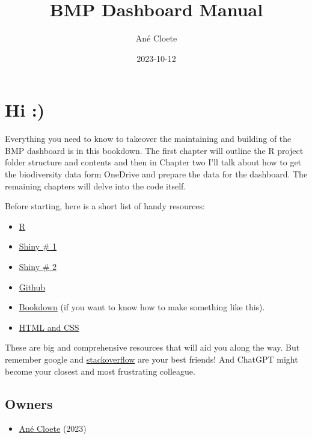 \documentclass[
]{book}
\title{BMP Dashboard Manual}
\author{Ané Cloete}
\date{2023-10-12}
\providecommand{\tightlist}{%
  \setlength{\itemsep}{0pt}\setlength{\parskip}{0pt}}
\begin{document}
\maketitle

{
\setcounter{tocdepth}{1}
\tableofcontents
}
\hypertarget{hi}{%
\chapter{Hi :)}\label{hi}}

Everything you need to know to takeover the maintaining and building of the BMP dashboard is in this bookdown. The first chapter will outline the R project folder structure and contents and then in Chapter two I'll talk about how to get the biodiversity data form OneDrive and prepare the data for the dashboard. The remaining chapters will delve into the code itself.

Before starting, here is a short list of handy resources:

\begin{itemize}
\item
  \href{https://bookdown.org/yih_huynh/Guide-to-R-Book/}{R}
\item
  \href{https://shiny.posit.co/r/articles/\#user-interface}{Shiny \# 1}
\item
  \href{https://mastering-shiny.org/}{Shiny \# 2}
\item
  \href{https://happygitwithr.com/existing-github-last}{Github}
\item
  \href{https://bookdown.org/yihui/bookdown/get-started.html}{Bookdown} (if you want to know how to make something like this).
\item
  \href{https://unleash-shiny.rinterface.com/}{HTML and CSS}
\end{itemize}

These are big and comprehensive resources that will aid you along the way. But remember google and \href{https://stackoverflow.com/}{stackoverflow} are your best friends! And ChatGPT might become your closest and most frustrating colleague.

\hypertarget{owners}{%
\section{Owners}\label{owners}}

\begin{itemize}
\tightlist
\item
  \href{https://www.linkedin.com/in/an\%C3\%A9-c-95629ab5/}{Ané Cloete} (2023)
\end{itemize}
\end{document}
